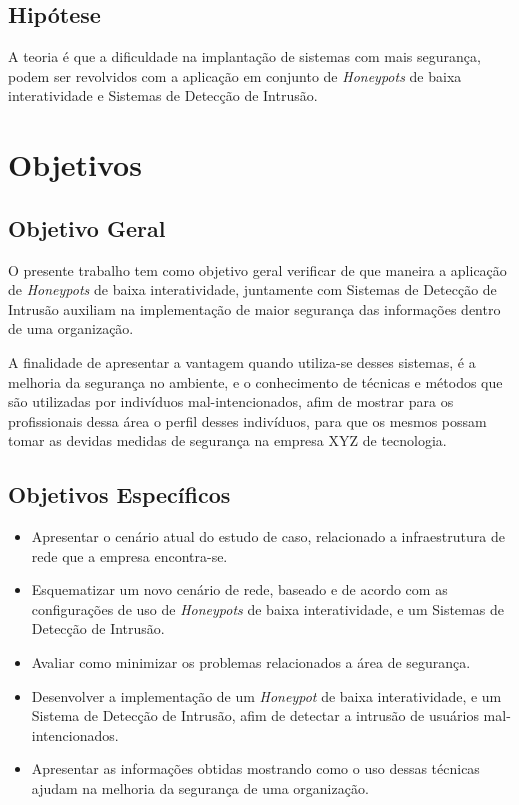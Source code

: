 \subsection{Hipótese}
A teoria é que a dificuldade na implantação de sistemas com mais segurança, podem ser revolvidos com a aplicação em conjunto de \textit{Honeypots} de baixa interatividade e Sistemas de Detecção de Intrusão.

\section{Objetivos}

\subsection{Objetivo Geral}
O presente trabalho tem como objetivo geral verificar de que maneira a aplicação de \textit{Honeypots} de baixa interatividade, juntamente com Sistemas de Detecção de Intrusão auxiliam na implementação de maior segurança das informações dentro de uma organização.

A finalidade de apresentar a vantagem quando utiliza-se desses sistemas, é a melhoria da segurança no ambiente, e o conhecimento de técnicas e métodos que são utilizadas por indivíduos mal-intencionados, afim de mostrar para os profissionais dessa área o perfil desses indivíduos, para que os mesmos possam tomar as devidas medidas de segurança na empresa XYZ de tecnologia.

\subsection{Objetivos Específicos}
\begin{itemize}
  \item Apresentar o cenário atual do estudo de caso, relacionado a infraestrutura de rede que a empresa encontra-se.
\end{itemize}

\begin{itemize}
  \item Esquematizar um novo cenário de rede, baseado e de acordo com as configurações de uso de \textit{Honeypots} de baixa interatividade, e um Sistemas de Detecção de Intrusão.
\end{itemize}

\begin{itemize}
  \item Avaliar como minimizar os problemas relacionados a área de segurança.
\end{itemize}

\begin{itemize}
  \item Desenvolver a implementação de um \textit{Honeypot} de baixa interatividade, e um Sistema de Detecção de Intrusão, afim de detectar a intrusão de usuários mal-intencionados.
\end{itemize}

\begin{itemize}
  \item Apresentar as informações obtidas mostrando como o uso dessas técnicas ajudam na melhoria da segurança de uma organização.
\end{itemize}
